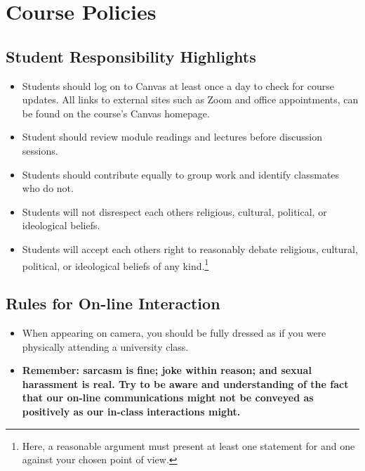 \documentclass[10pt,]{article}
\providecommand{\tightlist}{%
  \setlength{\itemsep}{0pt}\setlength{\parskip}{0pt}}
\begin{document}
\hypertarget{course-policies}{%
\section{Course Policies}\label{course-policies}}

\hypertarget{student-responsibility-highlights}{%
\subsection{Student Responsibility
Highlights}\label{student-responsibility-highlights}}

\begin{itemize}
\tightlist
\item
  Students should log on to Canvas at least once a day to check for
  course updates. All links to external sites such as Zoom and office
  appointments, can be found on the course's Canvas homepage.
\item
  Student should review module readings and lectures before discussion
  sessions.
\item
  Students should contribute equally to group work and identify
  classmates who do not.
\item
  Students will not disrespect each others religious, cultural,
  political, or ideological beliefs.
\item
  Students will accept each others right to reasonably debate religious,
  cultural, political, or ideological beliefs of any kind.\footnote{Here,
    a reasonable argument must present at least one statement for and
    one against your chosen point of view.}
\end{itemize}

\hypertarget{rules-for-on-line-interaction}{%
\subsection{Rules for On-line
Interaction}\label{rules-for-on-line-interaction}}

\begin{itemize}
\tightlist
\item
  When appearing on camera, you should be fully dressed as if you were
  physically attending a university class.
\item
  \textbf{Remember: sarcasm is fine; joke within reason; and sexual
  harassment is real. Try to be aware and understanding of the fact that
  our on-line communications might not be conveyed as positively as our
  in-class interactions might.}
\end{itemize}
\end{document}
